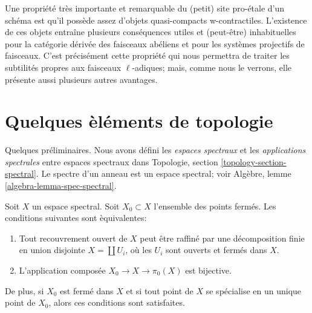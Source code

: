 \medskip\noindent
Une propri\'et\'e tr\`es importante et remarquable du
(petit) site pro-\'etale d'un sch\'ema est
qu'il poss\`ede assez d'objets quasi-compacts w-contractiles. L'existence
de ces objets entra\^ine
plusieurs cons\'equences utiles et (peut-\^etre) inhabituelles pour la cat\'egorie d\'eriv\'ee
des faisceaux ab\'eliens et pour les syst\`emes projectifs de faisceaux.
C'est pr\'ecis\'ement cette propri\'et\'e qui nous permettra de traiter
les subtilit\'es propres aux faisceaux $\ell$-adiques; mais, comme nous
le verrons, elle pr\'esente aussi plusieurs autres avantages.




\section{Quelques \`el\'ements de topologie}
\label{section-topology}

\noindent
Quelques pr\'eliminaires. Nous avons d\'efini les {\it espaces spectraux} et les
{\it applications spectrales} entre espaces spectraux dans
Topologie, section \ref{topology-section-spectral}.
Le spectre d'un anneau est un espace spectral; voir
Alg\`ebre, lemme \ref{algebra-lemma-spec-spectral}.

\begin{lemma}
\label{lemma-spectral-split}
Soit $X$ un espace spectral. Soit $X_0 \subset X$ l'ensemble des points ferm\'es.
Les conditions suivantes sont \`equivalentes:
\begin{enumerate}
\item Tout recouvrement ouvert de $X$ peut \^etre raffin\'e par une d\'ecomposition finie
en union disjointe $X = \coprod U_i$, o\`u les $U_i$ sont
ouverts et ferm\'es dans $X$.
\item L'application compos\'ee $X_0 \to X \to \pi_0(X)$ est bijective.
\end{enumerate}
De plus, si $X_0$ est ferm\'e dans $X$ et si tout point de $X$ se sp\'ecialise
en un unique point de $X_0$, alors ces conditions sont satisfaites.
\end{lemma}

